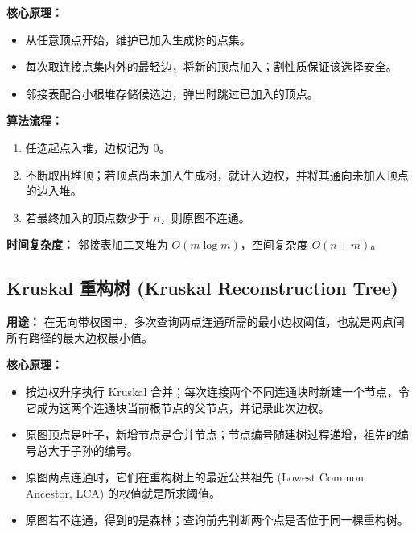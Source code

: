 \textbf{核心原理：}
\begin{itemize}
  \item 从任意顶点开始，维护已加入生成树的点集。
  \item 每次取连接点集内外的最轻边，将新的顶点加入；割性质保证该选择安全。
  \item 邻接表配合小根堆存储候选边，弹出时跳过已加入的顶点。
\end{itemize}

\textbf{算法流程：}
\begin{enumerate}
  \item 任选起点入堆，边权记为 $0$。
  \item 不断取出堆顶；若顶点尚未加入生成树，就计入边权，并将其通向未加入顶点的边入堆。
  \item 若最终加入的顶点数少于 $n$，则原图不连通。
\end{enumerate}

\textbf{时间复杂度：} 邻接表加二叉堆为 $O(m\log m)$，空间复杂度 $O(n+m)$。



\subsection{Kruskal 重构树 (Kruskal Reconstruction Tree)}

\textbf{用途：} 在无向带权图中，多次查询两点连通所需的最小边权阈值，也就是两点间所有路径的最大边权最小值。

\textbf{核心原理：}
\begin{itemize}
  \item 按边权升序执行 Kruskal 合并；每次连接两个不同连通块时新建一个节点，令它成为这两个连通块当前根节点的父节点，并记录此次边权。
  \item 原图顶点是叶子，新增节点是合并节点；节点编号随建树过程递增，祖先的编号总大于子孙的编号。
  \item 原图两点连通时，它们在重构树上的最近公共祖先 (Lowest Common Ancestor, LCA) 的权值就是所求阈值。
  \item 原图若不连通，得到的是森林；查询前先判断两个点是否位于同一棵重构树。
\end{itemize}

